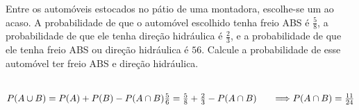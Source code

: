 \begin{ex}
Entre os automóveis estocados no pátio de uma montadora, escolhe-se um ao acaso. A probabilidade de que o automóvel escolhido tenha freio ABS é $\frac{5}{8}$, a probabilidade de que ele tenha direção hidráulica é $\frac{2}{3}$, e a probabilidade de que ele tenha freio ABS ou direção hidráulica é  ${5}{6}$. Calcule a probabilidade de esse automóvel ter freio ABS e direção hidráulica.
  \begin{sol}
   \phantom{A}\\
   $P(A\cup B)=P(A)+P(B)-P(A\cap B) \\  \frac{5}{6}=\frac{5}{8}+\frac{2}{3}-P(A\cap B)  \hspace{0,6cm} \Longrightarrow
   P(A \cap B)=\frac{11}{24}$
  \end{sol}
\end{ex}